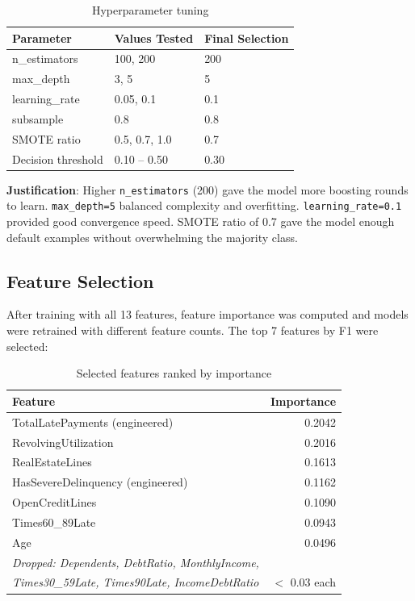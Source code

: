 \documentclass[12pt, a4paper]{article}
\begin{document}
\begin{table}[H]
\centering
\begin{tabular}{lll}
\toprule
\textbf{Parameter} & \textbf{Values Tested} & \textbf{Final Selection} \\
\midrule
n\_estimators & 100, 200 & 200 \\
max\_depth & 3, 5 & 5 \\
learning\_rate & 0.05, 0.1 & 0.1 \\
subsample & 0.8 & 0.8 \\
SMOTE ratio & 0.5, 0.7, 1.0 & 0.7 \\
Decision threshold & 0.10 -- 0.50 & 0.30 \\
\bottomrule
\end{tabular}
\caption{Hyperparameter tuning}
\end{table}

\textbf{Justification}: Higher \texttt{n\_estimators} (200) gave the model more boosting rounds to learn. \texttt{max\_depth=5} balanced complexity and overfitting. \texttt{learning\_rate=0.1} provided good convergence speed. SMOTE ratio of 0.7 gave the model enough default examples without overwhelming the majority class.

\subsection{Feature Selection}

After training with all 13 features, feature importance was computed and models were retrained with different feature counts. The top 7 features by F1 were selected:

\begin{table}[H]
\centering
\begin{tabular}{lr}
\toprule
\textbf{Feature} & \textbf{Importance} \\
\midrule
TotalLatePayments (engineered) & 0.2042 \\
RevolvingUtilization & 0.2016 \\
RealEstateLines & 0.1613 \\
HasSevereDelinquency (engineered) & 0.1162 \\
OpenCreditLines & 0.1090 \\
Times60\_89Late & 0.0943 \\
Age & 0.0496 \\
\midrule
\textit{Dropped: Dependents, DebtRatio, MonthlyIncome,} & \\
\textit{Times30\_59Late, Times90Late, IncomeDebtRatio} & $<$ 0.03 each \\
\bottomrule
\end{tabular}
\caption{Selected features ranked by importance}
\end{table}
\end{document}
